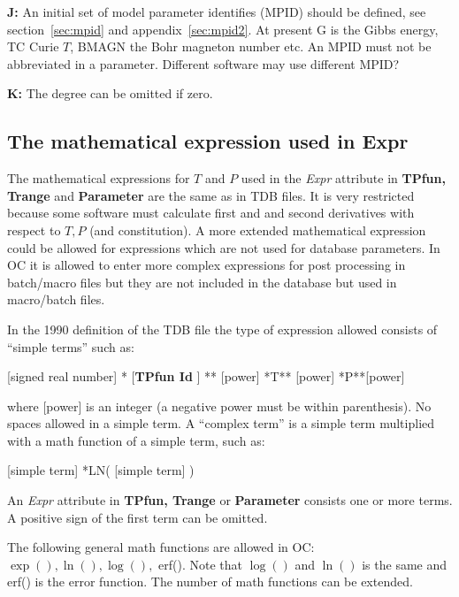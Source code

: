 \documentclass{article}
\begin{document}
\begin{description}
\item{\bf J:} An initial set of model parameter identifies (MPID)
  should be defined, see section~\ref{sec:mpid} and
  appendix~\ref{sec:mpid2}.  At present G is the Gibbs energy, TC
  Curie $T$, BMAGN the Bohr magneton number etc.  An MPID must not be
  abbreviated in a parameter.  Different software may use different
  MPID?

\item{\bf K:} The degree can be omitted if zero.


\end{description}

\newpage 

\subsection{The mathematical expression used in Expr}\label{sec:expr}

The mathematical expressions for $T$ and $P$ used in the {\em Expr}
attribute in {\bf TPfun, Trange} and {\bf Parameter} are the same as
in TDB files.  It is very restricted because some software must
calculate first and and second derivatives with respect to $T, P$ (and
constitution).  A more extended mathematical expression could be
allowed for expressions which are not used for database parameters.
In OC it is allowed to enter more complex expressions for post
processing in batch/macro files but they are not included in the
database but used in macro/batch files.

In the 1990 definition of the TDB file the type of expression allowed
consists of ``simple terms'' such as:

[signed real number] * [{\bf TPfun Id} ] ** [power] *T** [power] *P**[power]

where [power] is an integer (a negative power must be within
parenthesis).  No spaces allowed in a simple term.  A ``complex term''
is a simple term multiplied with a math function of a simple term,
such as:

[simple term] *LN( [simple term] )

An {\em Expr} attribute in {\bf TPfun, Trange} or {\bf Parameter}
consists one or more terms.  A positive sign of the first term can be
omitted.
  
The following general math functions are allowed in OC:\\ $\exp(),
\ln(), \log(),$ erf().  Note that $\log()$ and $\ln()$ is the same and
erf() is the error function.  The number of math functions can be
extended.
\end{document}
